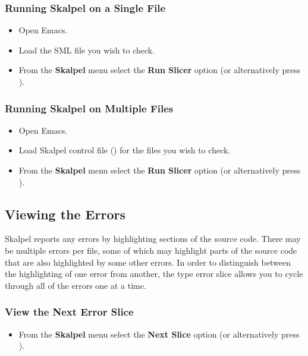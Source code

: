 \documentclass{report}
\begin{document}
\subsubsection{Running Skalpel on a Single File}

\begin{itemize}
\item Open Emacs.
\item Load the SML file you wish to check.
\item From the \textbf{Skalpel} menu select the \textbf{Run Slicer}
  option (or alternatively press ).
\end{itemize}

\subsubsection{Running Skalpel on Multiple Files}

\begin{itemize}
\item Open Emacs.
\item Load Skalpel control file () for
  the files you wish to check.

\item From the \textbf{Skalpel} menu select the \textbf{Run Slicer}
  option (or alternatively press ).
\end{itemize}


\subsection{Viewing the Errors}

Skalpel reports any errors by highlighting sections of
the source code. There may be multiple errors per file, some of which
may highlight parts of the source code that are also highlighted by
some other errors. In order to distinguish between the highlighting
of one error from another, the type error slice allows you to cycle
through all of the errors one at a time.

\subsubsection{View the Next Error Slice}

\begin{itemize}
\item From the \textbf{Skalpel} menu select the \textbf{Next Slice}
  option (or alternatively press ).
\end{itemize}
\end{document}

